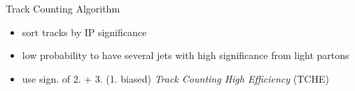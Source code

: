 \begin{frame}{Track Counting Algorithm}

	\begin{itemize}\itemfill
	\item sort tracks by IP significance
	\item low probability to have several jets with high significance from light partons
	\item use sign. of 2. + 3. (1. biased) \ra \textit{Track Counting High Efficiency} (TCHE)
	\end{itemize}
	

\end{frame}
